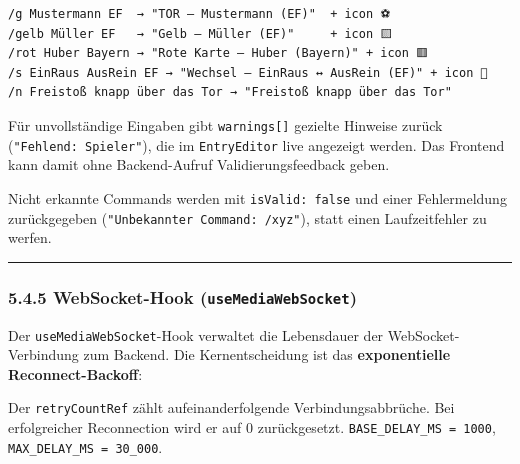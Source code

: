 \begin{verbatim}
/g Mustermann EF  → "TOR — Mustermann (EF)"  + icon ⚽
/gelb Müller EF   → "Gelb — Müller (EF)"     + icon 🟨
/rot Huber Bayern → "Rote Karte — Huber (Bayern)" + icon 🟥
/s EinRaus AusRein EF → "Wechsel — EinRaus ↔ AusRein (EF)" + icon 🔄
/n Freistoß knapp über das Tor → "Freistoß knapp über das Tor"
\end{verbatim}

Für unvollständige Eingaben gibt \texttt{warnings{[}{]}} gezielte
Hinweise zurück (\texttt{"Fehlend:\ Spieler"}), die im
\texttt{EntryEditor} live angezeigt werden. Das Frontend kann damit ohne
Backend-Aufruf Validierungsfeedback geben.

Nicht erkannte Commands werden mit \texttt{isValid:\ false} und einer
Fehlermeldung zurückgegeben (\texttt{"Unbekannter\ Command:\ /xyz"}),
statt einen Laufzeitfehler zu werfen.

\begin{center}\rule{0.5\linewidth}{0.5pt}\end{center}

\subsubsection{\texorpdfstring{5.4.5 WebSocket-Hook
(\texttt{useMediaWebSocket})}{5.4.5 WebSocket-Hook (useMediaWebSocket)}}\label{websocket-hook-usemediawebsocket}

Der \texttt{useMediaWebSocket}-Hook verwaltet die Lebensdauer der
WebSocket-Verbindung zum Backend. Die Kernentscheidung ist das
\textbf{exponentielle Reconnect-Backoff}:

\begin{Shaded}
\begin{Highlighting}[]
\OperatorTok{=} \NormalTok{(}
\OperatorTok{*}  \OperatorTok{**}\OperatorTok{,} 
\OperatorTok{,} 
\NormalTok{)}\OperatorTok{;}
\end{Highlighting}
\end{Shaded}

Der \texttt{retryCountRef} zählt aufeinanderfolgende
Verbindungsabbrüche. Bei erfolgreicher Reconnection wird er auf 0
zurückgesetzt. \texttt{BASE\_DELAY\_MS\ =\ 1000},
\texttt{MAX\_DELAY\_MS\ =\ 30\_000}.

